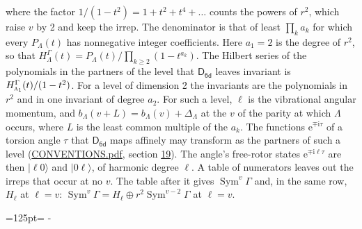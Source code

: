 \documentclass[10pt,a4paper]{article}
\newcommand{\needspace}[1]{\par\penalty-100\begingroup\dimen0=#1\relax\dimen2=\pagegoal
  \advance\dimen2-\pagetotal\ifdim\dimen0>\dimen2\relax\ifdim\dimen2>0pt\vfil\break\fi\fi
  \endgroup}
\numberwithin{equation}{section}
\newcommand{\grp}[1]{\mathsf{#1}}
\newcommand{\irr}[1]{\text{\normalfont\scshape #1}}
\newcommand{\iunit}{\mathrm{i}}
\newcommand{\expe}{\mathrm{e}}
\newcommand{\occ}[1]{\lvert #1\rangle}
\begin{document}
where the factor $1/(1 - t^2) = 1 + t^2 + t^4 + \dots$ counts the powers of $r^2$, which raise $v$ by 2 and keep the irrep. The denominator is that of least $\prod_k a_k$ for which every $P_\Lambda(t)$ has nonnegative integer coefficients. Here $a_1 = 2$ is the degree of $r^2$, so that $H^{\Gamma}_\Lambda(t) = P_\Lambda(t)/\prod_{k\ge2}(1 - t^{a_k})$. The Hilbert series of the polynomials in the partners of the level that $\grp{D_{6d}}$ leaves invariant is $H^{\Gamma}_{\irr{a}_{1}}(t)/(1 - t^2)$. For a level of dimension 2 the invariants are the polynomials in $r^2$ and in one invariant of degree $a_2$. \label{n:index.overtone.period}\label{n:index.increment.unitary}For such a level, $\ell$ is the vibrational angular momentum, and $b_\Lambda(v + L) = b_\Lambda(v) + \Delta_\Lambda$ at the $v$ of the parity at which $\Lambda$ occurs, where $L$ is the least common multiple of the $a_k$. \label{n:local.torsion.angle}The functions $\expe^{\mp\iunit\tau}$ of a torsion angle $\tau$ that $\grp{D_{6d}}$ maps affinely may transform as the partners of such a level (\href{../../CONVENTIONS.pdf}{CONVENTIONS.pdf}, section \href{../../CONVENTIONS.pdf\#conv.19}{19}). The angle's free-rotor states $\expe^{\mp\iunit\ell\tau}$ are then $\occ{\ell 0}$ and $\occ{0 \ell}$, of harmonic degree $\ell$. A table of numerators leaves out the irreps that occur at no $v$. The table after it gives $\operatorname{Sym}^{v}\Gamma$ and, in the same row, $H_\ell$ at $\ell = v$: $\operatorname{Sym}^{v}\Gamma = H_\ell \oplus r^2\operatorname{Sym}^{v-2}\Gamma$ at $\ell = v$.
\needspace{125pt}
\end{document}
